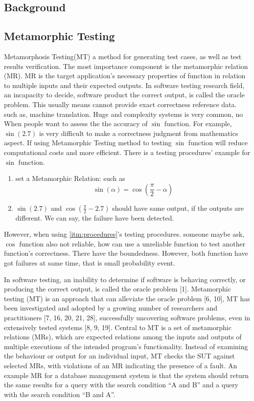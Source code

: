 \documentclass[conference]{IEEEtran}
\begin{document}
\begin{CJK*}{UTF8}{gbsn}
\section{Background}
\subsection{Metamorphic Testing}
Metamorphosis Testing(MT) a method for generating test cases, as well as test
results verification. The most importance component is the metamorphic
relation (MR). MR is the target application's necessary properties of function in relation to multiple
inputs and their expected outputs.
In software testing research field, an incapacity to decide, software product
the correct output, is called the oracle problem. This usually means cannot
provide exact correctness reference data. such as, machine translation. Huge and
complexity systems is very common, no
When people want to assess the the accuracy of $\sin$ function. For example, $\sin(2.7)$ is very difficult to
make a correctness judgment from mathematics aspect. If using Metamorphic
Testing method to testing $\sin$ function will reduce computational costs and
more efficient. There is a testing procedures' example for $\sin$ function.
\begin{enumerate}\label{itm:procedures}
\item set a Metamorphic Relation: such as $$\sin(\alpha) = \cos(\frac{\pi}{2} - \alpha)$$
\item $\sin(2.7)$ and $\cos(\frac{\pi}{2} - 2.7)$ should have same output, if the
  outputs are different. We can say, the failure have been detected.
\end{enumerate}
However, when using \ref{itm:procedures}'s testing procedures. someone maybe
ask, $\cos$ function also not reliable, how can use a unreliable function to
test another function's correctness. There have the boundedness. However, both
function have got failures at same time, that is small probability event.

In software testing, an inability to determine if software is behaving
correctly, or producing the correct output, is called the oracle problem [1]. Metamorphic testing (MT) is an approach that can alleviate
the oracle problem [6, 10], MT has been investigated and adopted by
a growing number of researchers and practitioners [7, 16, 20, 21, 28],
successfully uncovering software problems, even in extensively
tested systems [8, 9, 19]. Central to MT is a set of metamorphic
relations (MRs), which are expected relations among the inputs and
outputs of multiple executions of the intended program’s functionality. Instead of examining the behaviour or output for an individual
input, MT checks the SUT against selected MRs, with violations of
an MR indicating the presence of a fault.
An example MR for a database management system is that the
system should return the same results for a query with the search
condition “A and B” and a query with the search condition “B and
A”.

\end{CJK*}
\end{document}
